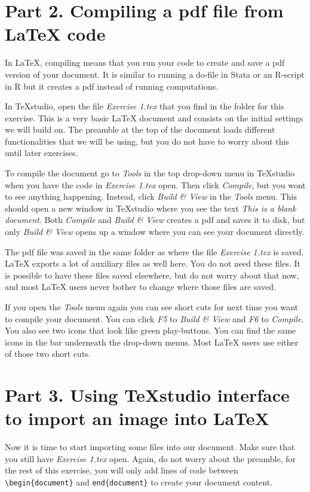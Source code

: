 \documentclass[12pts]{report}
\begin{document}
\section*{Part 2. Compiling a pdf file from  {\LaTeX} code}
In {\LaTeX}, compiling means that you run your code to create and save a pdf version of your document. It is similar to running a do-file in Stata or an R-script in R but it creates a pdf instead of running computations. 

In TeXstudio, open the file \emph{Exercise 1.tex} that you find in the folder for this exercise. This is a very basic {\LaTeX} document and consists on the initial settings we will build on. The preamble at the top of the document loads different functionalities that we will be using, but you do not have to worry about this until later exercises.

To compile the document go to \emph{Tools} in the top drop-down menu in TeXstudio when you have the code in \emph{Exercise 1.tex} open. Then click \emph{Compile}, but you wont to see anything happening. Instead, click \emph{Build \& View} in the \emph{Tools} menu. This should open a new window in TeXstudio where you see the text \emph{This is a blank document}. Both \emph{Compile} and \emph{Build \& View} creates a pdf and saves it to disk, but only \emph{Build \& View} opens up a window where you can see your document directly. 

The pdf file was saved in the same folder as where the file \emph{Exercise 1.tex} is saved. {\LaTeX} exports a lot of auxiliary files as well here. You do not need these files. It is possible to have these files saved elsewhere, but do not worry about that now, and most {\LaTeX} users never bother to change where those files are saved.

If you open the \emph{Tools} menu again you can see short cuts for next time you want to compile your document. You can click \emph{F5} to \emph{Build \& View} and \emph{F6} to \emph{Compile}. You also see two icons that look like green play-buttons. You can find the same icons in the bar underneath the drop-down menus. Most {\LaTeX} users use either of those two short cuts.

\section*{Part 3. Using TeXstudio interface to import an image into \LaTeX}
Now it is time to start importing some files into our document. Make sure that you still have \emph{Exercise 1.tex} open. Again, do not worry about the preamble, for the rest of this exercise, you will only add lines of code between \verb|\begin{document}| and \verb|end{document}| to create your document content.
\end{document}
